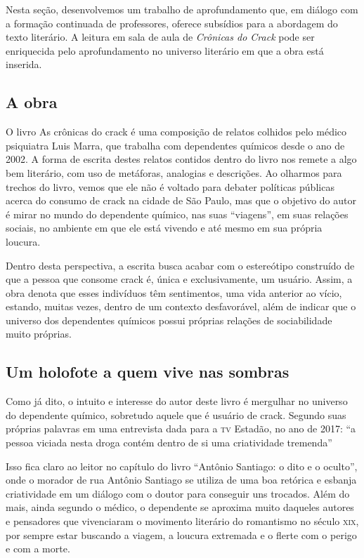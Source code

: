 \documentclass[11pt]{extarticle}
\begin{document}
Nesta seção, desenvolvemos um trabalho de aprofundamento que, em diálogo
com a formação continuada de professores, oferece subsídios para a
abordagem do texto literário. A leitura em sala de aula de
\emph{Crônicas do Crack} pode ser enriquecida pelo aprofundamento no
universo literário em que a obra está inserida.

\subsection{A obra}

O livro As crônicas do crack é uma composição de relatos colhidos
pelo médico psiquiatra Luis Marra, que trabalha com dependentes químicos
desde o ano de 2002. A forma de escrita destes relatos contidos dentro
do livro nos remete a algo bem literário, com uso de metáforas,
analogias e descrições. Ao olharmos para trechos do livro, vemos que ele
não é voltado para debater políticas públicas acerca do consumo de crack
na cidade de São Paulo, mas que o objetivo do autor é mirar no mundo do
dependente químico, nas suas ``viagens'', em suas relações sociais, no
ambiente em que ele está vivendo e até mesmo em sua própria loucura.

Dentro desta perspectiva, a escrita busca acabar com o estereótipo
construído de que a pessoa que consome crack é, única e exclusivamente,
um usuário. Assim, a obra denota que esses indivíduos têm sentimentos,
uma vida anterior ao vício, estando, muitas vezes, dentro de um contexto
desfavorável, além de indicar que o universo dos dependentes químicos
possui próprias relações de sociabilidade muito próprias.

\subsection{Um holofote a quem vive nas sombras}

Como já dito, o intuito e interesse do autor deste livro é mergulhar no
universo do dependente químico, sobretudo aquele que é usuário de crack.
Segundo suas próprias palavras em uma entrevista dada para a \textsc{tv} Estadão,
no ano de 2017: ``a pessoa viciada nesta droga contém dentro de si uma
criatividade tremenda''


Isso fica claro ao leitor no capítulo do livro ``Antônio Santiago: o
dito e o oculto'', onde o morador de rua Antônio Santiago se utiliza de
uma boa retórica e esbanja criatividade em um diálogo com o doutor para
conseguir uns trocados. Além do mais, ainda segundo o médico, o
dependente se aproxima muito daqueles autores e pensadores que
vivenciaram o movimento literário do romantismo no século \textsc{xix}, por
sempre estar buscando a viagem, a loucura extremada e o flerte com o
perigo e com a morte.
\end{document}
